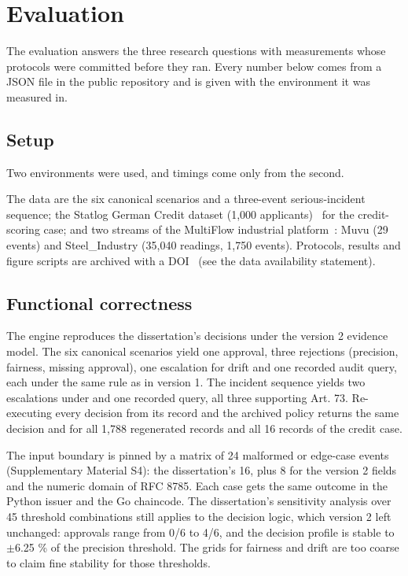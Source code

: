 \section{Evaluation}
\label{sec:evaluation}

The evaluation answers the three research questions with measurements whose protocols were committed before they ran. Every number below comes from a JSON file in the public repository and is given with the environment it was measured in.

\subsection{Setup}

Two environments were used, and timings come only from the second.



The data are the six canonical scenarios and a three-event serious-incident sequence; the Statlog German Credit dataset (1,000 applicants)~\cite{hofmann1994} for the credit-scoring case; and two streams of the MultiFlow industrial platform~\cite{torres2026}: Muvu (29 events) and Steel\_Industry (35,040 readings, 1,750 events). Protocols, results and figure scripts are archived with a DOI~\cite{artefacts} (see the data availability statement).

\subsection{Functional correctness}

The engine reproduces the dissertation's decisions under the version 2 evidence model. The six canonical scenarios yield one approval, three rejections (precision, fairness, missing approval), one escalation for drift and one recorded audit query, each under the same rule as in version 1. The incident sequence yields two escalations under  and one recorded query, all three supporting Art. 73. Re-executing every decision from its record and the archived policy returns the same decision and  for all 1,788 regenerated records and all 16 records of the credit case.

The input boundary is pinned by a matrix of 24 malformed or edge-case events (Supplementary Material S4): the dissertation's 16, plus 8 for the version 2 fields and the numeric domain of RFC 8785. Each case gets the same outcome in the Python issuer and the Go chaincode. The dissertation's sensitivity analysis over 45 threshold combinations still applies to the decision logic, which version 2 left unchanged: approvals range from 0/6 to 4/6, and the decision profile is stable to $\pm$6.25 \% of the precision threshold. The grids for fairness and drift are too coarse to claim fine stability for those thresholds.

